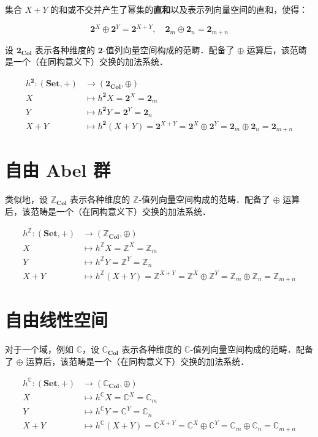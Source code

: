 \documentclass[10pt, openany]{book}
\begin{document}
集合 $X + Y$ 的和或不交并产生了幂集的\textbf{直和}以及表示列向量空间的直和，使得：

$$
\mathbf{2}^X \oplus \mathbf{2}^Y = \mathbf{2}^{X + Y},\quad \mathbf{2}_m \oplus \mathbf{2}_n = \mathbf{2}_{m+n}
$$

设 $\mathbf{2}_{\textbf{Col}}$ 表示各种维度的 $\mathbf{2}$-值列向量空间构成的范畴．配备了 $\oplus$ 运算后，该范畴是一个（在同构意义下）交换的加法系统．

$$
\begin{aligned}
h^{\mathbf{2}}: (\textbf{Set},+) &\to (\mathbf{2}_{\textbf{Col}},\oplus) \\
X &\mapsto h^{\mathbf{2}} X = \mathbf{2}^X = \mathbf{2}_m \\ 
Y &\mapsto h^{\mathbf{2}} Y = \mathbf{2}^Y = \mathbf{2}_n \\ 
X + Y &\mapsto h^{\mathbf{2}} (X + Y) = \mathbf{2}^{X+Y} = \mathbf{2}^X \oplus \mathbf{2}^Y = \mathbf{2}_m \oplus \mathbf{2}_n = \mathbf{2}_{m+n}
\end{aligned}
$$

\section{自由 Abel 群}

类似地，设 $\mathbb Z_{\textbf{Col}}$ 表示各种维度的 $\mathbb Z$-值列向量空间构成的范畴．配备了 $\oplus$ 运算后，该范畴是一个（在同构意义下）交换的加法系统．

$$
\begin{aligned}
h^{\mathbb Z}: (\textbf{Set},+) &\to (\mathbb Z_{\textbf{Col}},\oplus) \\ 
X &\mapsto h^{\mathbb Z} X = \mathbb Z^X = \mathbb Z_m \\ 
Y &\mapsto h^{\mathbb Z} Y = \mathbb Z^Y = \mathbb Z_n \\ 
X + Y &\mapsto h^{\mathbb Z} (X + Y) = \mathbb Z^{X+Y} = \mathbb Z^X \oplus \mathbb Z^Y = \mathbb Z_m \oplus \mathbb Z_n = \mathbb Z_{m+n}
\end{aligned}
$$

\section{自由线性空间}

对于一个域，例如 $\mathbb C$，设 $\mathbb C_{\textbf{Col}}$ 表示各种维度的 $\mathbb C$-值列向量空间构成的范畴．配备了 $\oplus$ 运算后，该范畴是一个（在同构意义下）交换的加法系统．

$$
\begin{aligned}
h^{\mathbb C}: (\textbf{Set},+) &\to (\mathbb C_{\textbf{Col}},\oplus) \\
X &\mapsto h^{\mathbb C} X = \mathbb C^X = \mathbb C_m \\ 
Y &\mapsto h^{\mathbb C} Y = \mathbb C^Y = \mathbb C_n \\ 
X + Y &\mapsto h^{\mathbb C} (X + Y) = \mathbb C^{X+Y} = \mathbb C^X \oplus \mathbb C^Y = \mathbb C_m \oplus \mathbb C_n = \mathbb C_{m+n}
\end{aligned}
$$
\end{document}
